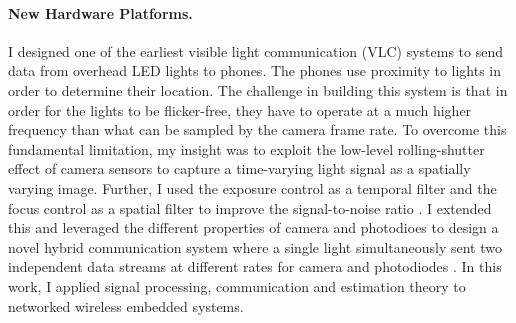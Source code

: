 \documentclass[10pt]{article}
\begin{document}

\paragraph{New Hardware Platforms. }

I designed one of the earliest visible light communication (VLC) systems to send data from overhead LED lights to phones. The phones use proximity to lights in order to determine their location.  The challenge in building this system is that in order for the lights to be flicker-free, they have to operate at a much higher frequency than what can be sampled by the camera frame rate. 
To overcome this fundamental limitation, my insight was to exploit the low-level rolling-shutter effect of camera sensors to capture a time-varying light signal as a spatially varying image. Further, I used the exposure control as a temporal filter and the focus control as a spatial filter to improve the signal-to-noise ratio \cite{rajagopal2014visual, rajagopal2014demonstration}. I extended this and leveraged the different properties of camera and photodioes to design a novel hybrid communication system where a single light simultaneously sent two independent data streams at different rates for camera and photodiodes \cite{rajagopal2014hybrid}. In this work, I applied signal processing, communication and estimation theory to networked wireless embedded systems.
\end{document}
